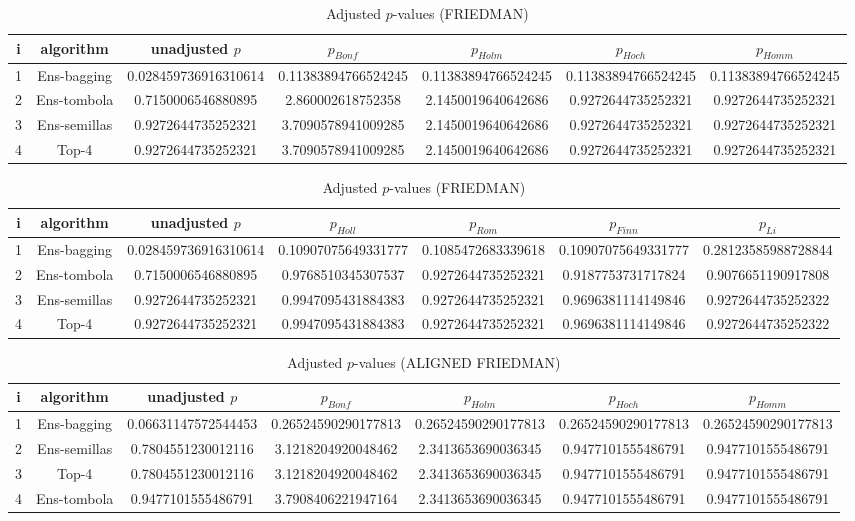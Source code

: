 \documentclass[a4paper,10pt]{article}
\begin{document}
\begin{landscape}
\newpage

\begin{table}[!htp]
\centering\scriptsize
\caption{Adjusted $p$-values (FRIEDMAN)}
\begin{tabular}{ccccccc}
i&algorithm&unadjusted $p$&$p_{Bonf}$&$p_{Holm}$&$p_{Hoch}$&$p_{Homm}$\\
\hline
1&Ens-bagging&0.028459736916310614&0.11383894766524245&0.11383894766524245&0.11383894766524245&0.11383894766524245\\
2&Ens-tombola&0.7150006546880895&2.860002618752358&2.1450019640642686&0.9272644735252321&0.9272644735252321\\
3&Ens-semillas&0.9272644735252321&3.7090578941009285&2.1450019640642686&0.9272644735252321&0.9272644735252321\\
4&Top-4&0.9272644735252321&3.7090578941009285&2.1450019640642686&0.9272644735252321&0.9272644735252321\\
\hline
\end{tabular}
\end{table}

\begin{table}[!htp]
\centering\scriptsize
\caption{Adjusted $p$-values (FRIEDMAN)}
\begin{tabular}{ccccccc}
i&algorithm&unadjusted $p$&$p_{Holl}$&$p_{Rom}$&$p_{Finn}$&$p_{Li}$\\
\hline
1&Ens-bagging&0.028459736916310614&0.10907075649331777&0.1085472683339618&0.10907075649331777&0.28123585988728844\\
2&Ens-tombola&0.7150006546880895&0.9768510345307537&0.9272644735252321&0.9187753731717824&0.9076651190917808\\
3&Ens-semillas&0.9272644735252321&0.9947095431884383&0.9272644735252321&0.9696381114149846&0.9272644735252322\\
4&Top-4&0.9272644735252321&0.9947095431884383&0.9272644735252321&0.9696381114149846&0.9272644735252322\\
\hline
\end{tabular}
\end{table}


\newpage

\begin{table}[!htp]
\centering\scriptsize
\caption{Adjusted $p$-values (ALIGNED FRIEDMAN)}
\begin{tabular}{ccccccc}
i&algorithm&unadjusted $p$&$p_{Bonf}$&$p_{Holm}$&$p_{Hoch}$&$p_{Homm}$\\
\hline
1&Ens-bagging&0.06631147572544453&0.26524590290177813&0.26524590290177813&0.26524590290177813&0.26524590290177813\\
2&Ens-semillas&0.7804551230012116&3.1218204920048462&2.3413653690036345&0.9477101555486791&0.9477101555486791\\
3&Top-4&0.7804551230012116&3.1218204920048462&2.3413653690036345&0.9477101555486791&0.9477101555486791\\
4&Ens-tombola&0.9477101555486791&3.7908406221947164&2.3413653690036345&0.9477101555486791&0.9477101555486791\\
\hline
\end{tabular}
\end{table}


\end{landscape}
\end{document}
